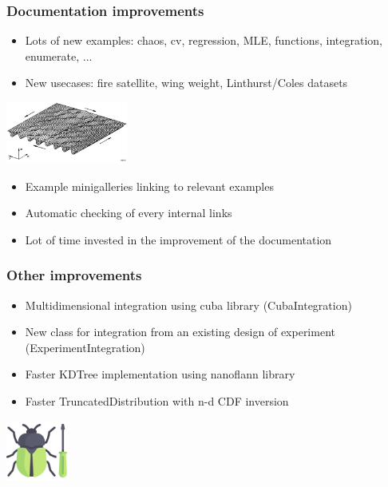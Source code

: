 \documentclass[aspectratio=169]{beamer}
\begin{document}
\begin{frame}
\frametitle{Documentation improvements}
\begin{itemize}
\item Lots of new examples: chaos, cv, regression, MLE, functions, integration, enumerate, ...
\item New usecases: fire satellite, wing weight, Linthurst/Coles datasets
\end{itemize}

\begin{center}
\includegraphics[width=0.3\textwidth]{figures/stiffened_panel_simulation}
\end{center}

\begin{itemize}
\item Example minigalleries linking to relevant examples
\item Automatic checking of every internal links
\item Lot of time invested in the improvement of the documentation
\end{itemize}
\end{frame}


\begin{frame}
\frametitle{Other improvements}
\begin{itemize}
\item Multidimensional integration using cuba library (CubaIntegration)
\item New class for integration from an existing design of experiment (ExperimentIntegration)
\item Faster KDTree implementation using nanoflann library
\item Faster TruncatedDistribution with n-d CDF inversion
\end{itemize}

\vspace{6pt}

\begin{center}
\includegraphics[width=0.15\textwidth]{figures/bugfix}
\end{center}

\end{frame}
\end{document}

